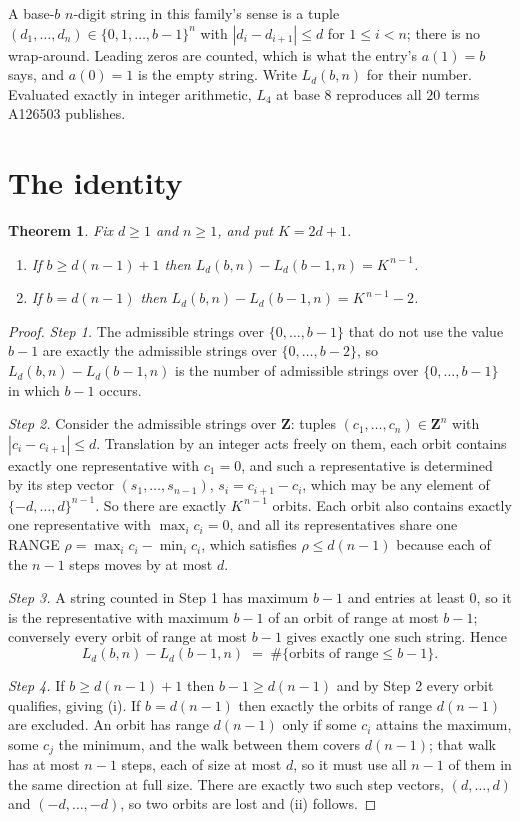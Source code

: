 \documentclass[11pt,a4paper]{article}
\theoremstyle{plain}
\newtheorem{theorem}{Theorem}
\theoremstyle{definition}
\begin{document}
A base-$b$ $n$-digit string in this family's sense is a tuple
$(d_1,\dots,d_n)\in\{0,1,\dots,b-1\}^{n}$ with $|d_i-d_{i+1}|\le d$ for $1\le i<n$; there
is no wrap-around. Leading zeros are counted, which is what the entry's $a(1)=b$ says, and
$a(0)=1$ is the empty string. Write $L_d(b,n)$ for their number. Evaluated exactly in integer
arithmetic, $L_{4}$ at base $8$ reproduces all $20$ terms A126503 publishes.

\section{The identity}

\begin{theorem}
Fix $d\ge1$ and $n\ge1$, and put $K=2d+1$.
\begin{enumerate}
\item[(i)] If $b\ge d(n-1)+1$ then $L_d(b,n)-L_d(b-1,n)=K^{\,n-1}$.
\item[(ii)] If $b=d(n-1)$ then $L_d(b,n)-L_d(b-1,n)=K^{\,n-1}-2$.
\end{enumerate}
\end{theorem}

\begin{proof}
\emph{Step 1.} The admissible strings over $\{0,\dots,b-1\}$ that do not use the value $b-1$
are exactly the admissible strings over $\{0,\dots,b-2\}$, so $L_d(b,n)-L_d(b-1,n)$ is the
number of admissible strings over $\{0,\dots,b-1\}$ in which $b-1$ occurs.

\emph{Step 2.} Consider the admissible strings over $\mathbf{Z}$: tuples
$(c_1,\dots,c_n)\in\mathbf{Z}^{n}$ with $|c_i-c_{i+1}|\le d$. Translation by an integer acts
freely on them, each orbit contains exactly one representative with $c_1=0$, and such a
representative is determined by its step vector $(s_1,\dots,s_{n-1})$, $s_i=c_{i+1}-c_i$,
which may be any element of $\{-d,\dots,d\}^{n-1}$. So there are exactly $K^{\,n-1}$ orbits.
Each orbit also contains exactly one representative with $\max_i c_i=0$, and all its
representatives share one RANGE $\rho=\max_ic_i-\min_ic_i$, which satisfies
$\rho\le d(n-1)$ because each of the $n-1$ steps moves by at most $d$.

\emph{Step 3.} A string counted in Step 1 has maximum $b-1$ and entries at least $0$, so it is
the representative with maximum $b-1$ of an orbit of range at most $b-1$; conversely every orbit
of range at most $b-1$ gives exactly one such string. Hence
\[
L_d(b,n)-L_d(b-1,n)\;=\;\#\{\text{orbits of range}\le b-1\} .
\]

\emph{Step 4.} If $b\ge d(n-1)+1$ then $b-1\ge d(n-1)$ and by Step 2 every orbit qualifies,
giving (i). If $b=d(n-1)$ then exactly the orbits of range $d(n-1)$ are excluded. An orbit has
range $d(n-1)$ only if some $c_i$ attains the maximum, some $c_j$ the minimum, and the walk
between them covers $d(n-1)$; that walk has at most $n-1$ steps, each of size at most $d$, so it
must use all $n-1$ of them in the same direction at full size. There are exactly two such step
vectors, $(d,\dots,d)$ and $(-d,\dots,-d)$, so two orbits are lost and (ii) follows.
\end{proof}
\end{document}
